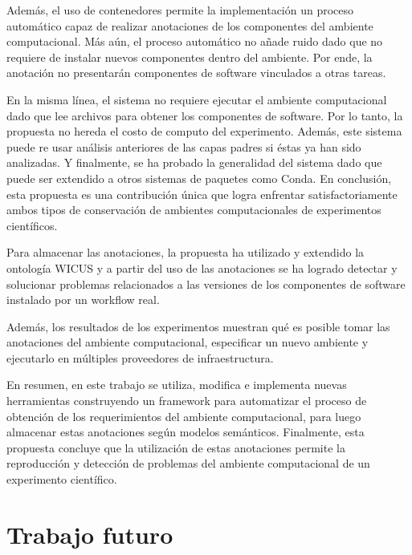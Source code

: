 Además, el uso de contenedores permite la implementación un proceso 
automático capaz de realizar anotaciones de los componentes del
ambiente computacional. 
Más aún, el proceso automático no añade ruido dado que no requiere de instalar nuevos componentes dentro del ambiente. 
Por ende, la anotación no presentarán componentes de software vinculados a otras tareas.

En la misma línea, el sistema no requiere ejecutar el ambiente 
computacional dado que lee archivos para obtener 
los componentes de software.
Por lo tanto, la propuesta no hereda el costo de computo del
experimento.
Además, este sistema puede re usar análisis anteriores de las capas padres si éstas ya han sido analizadas. 
Y finalmente, se ha probado la generalidad del sistema dado que puede 
ser extendido a otros sistemas de paquetes como Conda.
En conclusión, esta propuesta es una contribución única 
que logra enfrentar satisfactoriamente ambos tipos de conservación de ambientes computacionales de experimentos científicos. 


Para almacenar las anotaciones, la propuesta ha utilizado y extendido la ontología WICUS \cite{santana2015towards} y a partir del uso de las anotaciones se ha logrado detectar y solucionar problemas relacionados a las versiones de los componentes de software instalado por un workflow real.

Además, los resultados de los experimentos muestran qué es posible tomar las anotaciones del ambiente computacional, especificar un nuevo ambiente y ejecutarlo en múltiples proveedores de infraestructura.


En resumen, en este trabajo se utiliza, modifica e implementa nuevas herramientas construyendo un framework para automatizar el proceso de obtención de los requerimientos del ambiente computacional, para luego almacenar estas anotaciones según modelos semánticos. Finalmente, esta propuesta concluye que la utilización de estas anotaciones permite la reproducción y detección de problemas del ambiente computacional de un experimento científico.

\section{Trabajo futuro}

